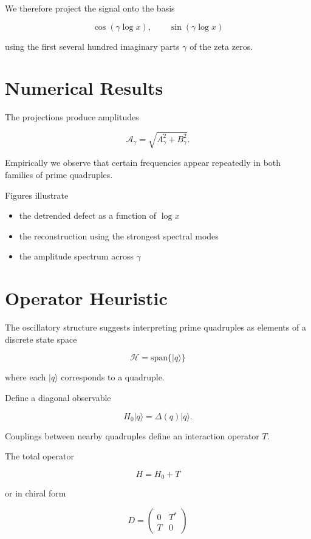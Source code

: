 \documentclass[11pt]{article}
\begin{document}
	We therefore project the signal onto the basis
	
	\[
	\cos(\gamma \log x),\qquad
	\sin(\gamma \log x)
	\]
	
	using the first several hundred imaginary parts $\gamma$ of the zeta zeros.
	
	\section{Numerical Results}
	
	The projections produce amplitudes
	
	\[
	\mathcal A_\gamma
	=
	\sqrt{A_\gamma^2+B_\gamma^2}.
	\]
	
	Empirically we observe that certain frequencies appear repeatedly in both families of prime quadruples.
	
	Figures illustrate
	
	\begin{itemize}
		\item the detrended defect as a function of $\log x$
		\item the reconstruction using the strongest spectral modes
		\item the amplitude spectrum across $\gamma$
	\end{itemize}
	
	\section{Operator Heuristic}
	
	The oscillatory structure suggests interpreting prime quadruples as elements of a discrete state space
	
	\[
	\mathcal H = \text{span}\{|q\rangle\}
	\]
	
	where each $|q\rangle$ corresponds to a quadruple.
	
	Define a diagonal observable
	
	\[
	H_0|q\rangle=\Delta(q)|q\rangle .
	\]
	
	Couplings between nearby quadruples define an interaction operator $T$.
	
	The total operator
	
	\[
	H=H_0+T
	\]
	
	or in chiral form
	
	\[
	D=
	\begin{pmatrix}
		0 & T^\ast\\
		T & 0
	\end{pmatrix}
	\]
	
\end{document}
